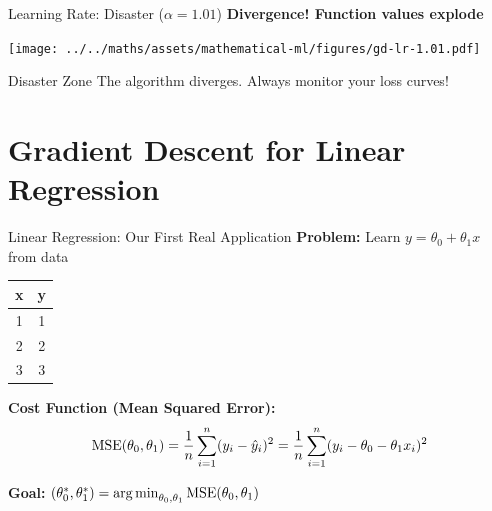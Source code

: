 \documentclass[usenames,dvipsnames]{beamer}
\begin{document}
  \begin{frame}{Learning Rate: Disaster ($\alpha = 1.01$)}
    \textbf{Divergence! Function values explode}
    \begin{center}
    \texttt{[image: ../../maths/assets/mathematical-ml/figures/gd-lr-1.01.pdf]}
    \end{center}
    
    \begin{alertbox}{Disaster Zone}
    The algorithm diverges. Always monitor your loss curves!
    \end{alertbox}
  \end{frame}

  \section{Gradient Descent for Linear Regression}

  \begin{frame}{Linear Regression: Our First Real Application}
    \textbf{Problem:} Learn $y = \theta_0 + \theta_1 x$ from data
    
    \begin{center}
    \begin{tabular}{|c|c|}
        \hline
        \textbf{x} & \textbf{y} \\
        \hline
        1 & 1 \\
        2 & 2 \\
        3 & 3 \\
        \hline
    \end{tabular}
    \end{center}
    
    \pause
    \textbf{Cost Function (Mean Squared Error):}
    $$\operatorname{MSE}(\theta_0, \theta_1) = \frac{1}{n}\sum_{i=1}^n (y_i - \hat{y}_i)^2 = \frac{1}{n}\sum_{i=1}^n (y_i - \theta_0 - \theta_1 x_i)^2$$
    
    \pause
    \textbf{Goal:} $(\theta_0^*, \theta_1^*) = \operatorname*{arg\,min}_{\theta_0, \theta_1} \operatorname{MSE}(\theta_0, \theta_1)$
  \end{frame}
\end{document}

